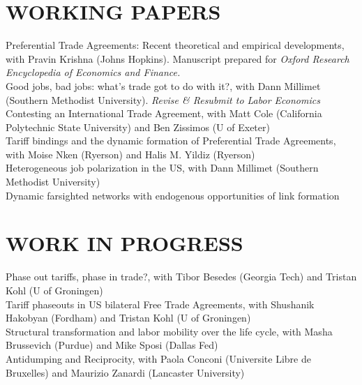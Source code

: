 \documentclass[11pt]{res}
\begin{document}
\begin{resume}
\section{WORKING PAPERS}\vspace{1.5mm}
{Preferential Trade Agreements: Recent theoretical and empirical developments}, with Pravin Krishna (Johns Hopkins). Manuscript prepared for \emph{Oxford Research Encyclopedia of Economics and Finance.}\vspace{1.5mm}\\
{Good jobs, bad jobs: what's trade got to do with it?}, with Dann Millimet (Southern Methodist University). \emph{Revise \& Resubmit to Labor Economics}\vspace{1.5mm}\\
{Contesting an International Trade Agreement}, with Matt Cole (California Polytechnic State University) and Ben Zissimos (U of Exeter) \vspace{1.5mm}\\
{Tariff bindings and the dynamic formation of Preferential Trade Agreements}, with Moise Nken (Ryerson) and Halis M. Yildiz (Ryerson)\vspace{1.5mm}\\
{Heterogeneous job polarization in the US}, with Dann Millimet (Southern Methodist University)\vspace{1.5mm}\\
{Dynamic farsighted networks with endogenous opportunities of link formation}

\section{WORK IN PROGRESS}\vspace{1.5mm}
Phase out tariffs, phase in trade?, with Tibor Besedes (Georgia Tech) and Tristan Kohl (U of Groningen) \vspace{1.5mm}\\
Tariff phaseouts in US bilateral Free Trade Agreements, with Shushanik Hakobyan (Fordham) and Tristan Kohl (U of Groningen)\vspace{1.5mm}\\
Structural transformation and labor mobility over the life cycle, with Masha Brussevich (Purdue) and Mike Sposi (Dallas Fed)\vspace{1.5mm}\\
Antidumping and Reciprocity, with Paola Conconi (Universite Libre de Bruxelles) and Maurizio Zanardi (Lancaster University)




\end{resume}
\end{document}
